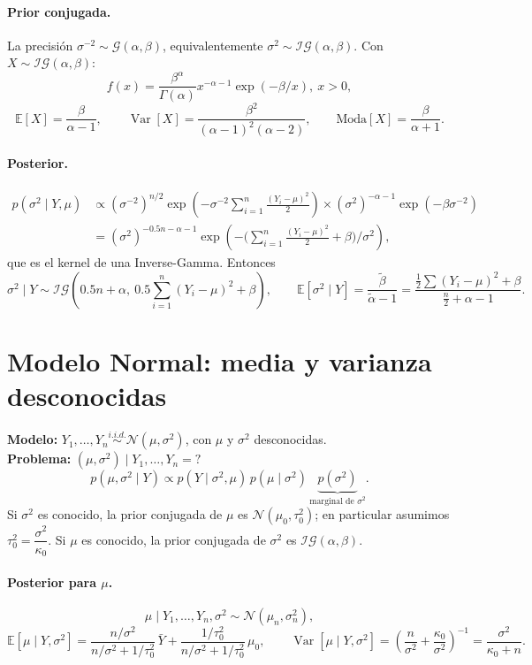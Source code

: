 \documentclass[11pt]{article}
\newcommand{\N}{\mathcal{N}}
\newcommand{\IG}{\mathcal{IG}}
\newcommand{\Ga}{\mathcal{G}}
\newcommand{\E}{\mathbb{E}}
\newcommand{\Var}{\operatorname{Var}}
\theoremstyle{definition}
\begin{document}
\paragraph{Prior conjugada.} La precisión $\sigma^{-2}\sim\Ga(\alpha,\beta)$, equivalentemente $\sigma^2\sim\IG(\alpha,\beta)$. Con $X\sim\IG(\alpha,\beta)$:
\[
f(x)=\frac{\beta^\alpha}{\Gamma(\alpha)}x^{-\alpha-1}\exp(-\beta/x),\ x>0,
\]
\[
\E[X]=\frac{\beta}{\alpha-1},\qquad \Var[X]=\frac{\beta^2}{(\alpha-1)^2(\alpha-2)},\qquad \text{Moda}[X]=\frac{\beta}{\alpha+1}.
\]

\paragraph{Posterior.}
\begin{align*}
p(\sigma^2\mid Y,\mu)&\propto(\sigma^{-2})^{n/2}\exp\!\left(-\sigma^{-2}\sum_{i=1}^n\frac{(Y_i-\mu)^2}{2}\right)\times(\sigma^2)^{-\alpha-1}\exp(-\beta\sigma^{-2})\\
&=(\sigma^2)^{-0.5n-\alpha-1}\exp\!\left(-\Big(\sum_{i=1}^n\frac{(Y_i-\mu)^2}{2}+\beta\Big)\Big/\sigma^2\right),
\end{align*}
que es el kernel de una Inverse-Gamma. Entonces
\[
\sigma^2\mid Y\sim\IG\!\left(0.5n+\alpha,\ 0.5\sum_{i=1}^n(Y_i-\mu)^2+\beta\right),
\qquad
\E[\sigma^2\mid Y]=\frac{\tilde\beta}{\tilde\alpha-1}=\frac{\tfrac12\sum(Y_i-\mu)^2+\beta}{\tfrac{n}{2}+\alpha-1}.
\]

\section{Modelo Normal: media y varianza desconocidas}
\textbf{Modelo:} $Y_1,\dots,Y_n\overset{i.i.d.}{\sim}\N(\mu,\sigma^2)$, con $\mu$ y $\sigma^2$ desconocidas.\\
\textbf{Problema:} $(\mu,\sigma^2)\mid Y_1,\dots,Y_n=?$
\[
p(\mu,\sigma^2\mid Y)\propto p(Y\mid\sigma^2,\mu)\,p(\mu\mid\sigma^2)\,\underbrace{p(\sigma^2)}_{\text{marginal de }\sigma^2}.
\]
Si $\sigma^2$ es conocido, la prior conjugada de $\mu$ es $\N(\mu_0,\tau_0^2)$; en particular asumimos $\tau_0^2=\dfrac{\sigma^2}{\kappa_0}$. Si $\mu$ es conocido, la prior conjugada de $\sigma^2$ es $\IG(\alpha,\beta)$.

\paragraph{Posterior para $\mu$.}
\[
\mu\mid Y_1,\dots,Y_n,\sigma^2\sim\N(\mu_n,\sigma_n^2),
\]
\[
\E[\mu\mid Y,\sigma^2]=\frac{n/\sigma^2}{n/\sigma^2+1/\tau_0^2}\,\bar Y+\frac{1/\tau_0^2}{n/\sigma^2+1/\tau_0^2}\,\mu_0,
\qquad
\Var[\mu\mid Y,\sigma^2]=\left(\frac{n}{\sigma^2}+\frac{\kappa_0}{\sigma^2}\right)^{-1}=\frac{\sigma^2}{\kappa_0+n}.
\]
\end{document}
